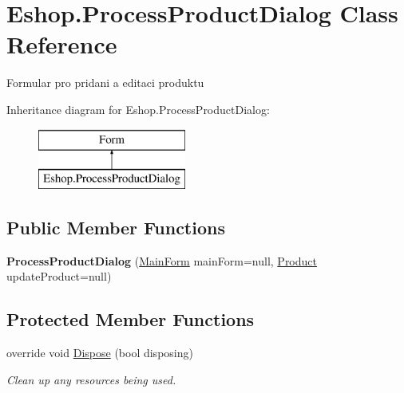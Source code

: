 \hypertarget{class_eshop_1_1_process_product_dialog}{}\section{Eshop.\+Process\+Product\+Dialog Class Reference}
\label{class_eshop_1_1_process_product_dialog}


Formular pro pridani a editaci produktu  


Inheritance diagram for Eshop.\+Process\+Product\+Dialog\+:\begin{figure}[H]
\begin{center}
\leavevmode
\includegraphics[height=2.000000cm]{class_eshop_1_1_process_product_dialog}
\end{center}
\end{figure}
\subsection*{Public Member Functions}
\begin{DoxyCompactItemize}
\item 
\mbox{\label{class_eshop_1_1_process_product_dialog_a58725119ac12a37b1ea1cf59ab474bdc}} 
{\bfseries Process\+Product\+Dialog} (\mbox{\hyperlink{class_eshop_1_1_main_form}{Main\+Form}} main\+Form=null, \mbox{\hyperlink{class_eshop_1_1_product}{Product}} update\+Product=null)
\end{DoxyCompactItemize}
\subsection*{Protected Member Functions}
\begin{DoxyCompactItemize}
\item 
override void \mbox{\hyperlink{class_eshop_1_1_process_product_dialog_a76f5995083af4714cc101c52d59b7e95}{Dispose}} (bool disposing)
\begin{DoxyCompactList}\small\item\em Clean up any resources being used. \end{DoxyCompactList}\end{DoxyCompactItemize}
